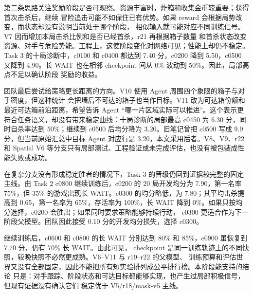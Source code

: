 \documentclass[UTF8,11pt,a4paper,fontset=none]{ctexart}
\begin{document}
第二条思路关注奖励阶段是否可观察。资源丰富时，炸箱和收集金币较重要；获得首次击杀后，继续
冒险追击可能不如保住已有优势。如果 reward 会根据局势改变，而状态却没有说明当前处于哪个阶段，
相似输入就可能对应不同训练信号。V7 因而增加本局击杀比例和是否已经首杀，r21 再根据箱子数量
和首杀状态改变资源、对手与危险势能。工程上，这使阶段变化对网络可见；性能上却仍不稳定。
Task 3 的十局诊断中，c0100 和 c0400 都达到 7.40 分，c0200 降到 5.50，c0500 又降到
4.90。长 WAIT 也在相邻 checkpoint 间从 0\% 波动到 50\%。因此，局部高点不足以确认阶段
奖励的收益。

团队最后尝试给策略更长距离的方向。V10 使用 Agent 周围四个象限的箱子与对手密度，但这种统计
会把墙后不可达的箱子也当作目标。V11 改为可达箱份额和最近可达箱前沿距离，希望告诉 Agent
“哪一片区域实际可以推进”。这个表示更符合任务语义，却没有带来稳定曲线：十局诊断的局部最高
c0450 为 6.30 分，同时自杀率达到 50\%；继续到 c0500 后均分降为 3.20。旧笔记曾把 c0500
写成 9.9 分，但当前原始汇总中目标 Agent 对应行是 3.20，本文采用后者。V8、V9、r22 和
Spatial V6 等分支只有局部测试、工程验证或未完成评估，也没有被包装成性能失败或成功。

在复杂分支没有形成稳定胜者的情况下，Task 3 的晋级仍回到证据较完整的固定主线。由 Task 2
c0800 继续训练后，c0200 的 20 局开发均分为 7.90，第一名率 75\%，但 35\% 的游戏出现长
WAIT。c0300 的均分略低，为 7.80；其平均击杀提高到 0.65，第一名率为 65\%，存活率为
100\%，长 WAIT 降到 0\%。如果只按均分选择，c0200 会胜出；如果同时要求策略能够持续行动，
c0300 更适合作为下一阶段父模型。团队因此接受 0.10 分的开发均分损失，选择 c0300。

继续训练后，c0600 和 c0800
的长 WAIT 分别达到 80\% 和 85\%，c0900 虽恢复到 7.70 分，仍有 70\% 长 WAIT。由此可见，
checkpoint 是同一训练轨迹上的不同快照，较晚快照不必然更成熟。V6--V11 与 r19--r22 的父模型、
训练预算和评估世界又没有全部固定，因此不能把所有短实验排列成公平排行榜。本阶段能支持的结论
只是：对手跟踪、阶段状态和可达目标都能够实现，也产生过局部积极信号，但现有证据没有确认它们
稳定优于 V5/r18/mask-v5 主线。
\end{document}
